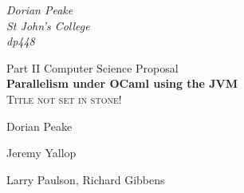\begin{titlepage}

\begin{flushright}
{\large \emph{Dorian Peake\\
      St John's College\\
      dp448}}
\end{flushright}

\vspace{3cm}

\begin{center}
{\LARGE Part II Computer Science Proposal}\\[1cm]
{\LARGE \bfseries Parallelism under OCaml using the JVM}\\[0.5cm]
\textsc{Title not set in stone!}

\vspace{3cm}

\begin{description}
{\large
\item[Project Originator:]Dorian Peake\\[1cm]
\item[Project Supervisor:]Jeremy Yallop\\[1cm]
\item[Project Overseers:]Larry Paulson, Richard Gibbens\\[1cm]
}
\end{description}
\end{center}
\end{titlepage}
